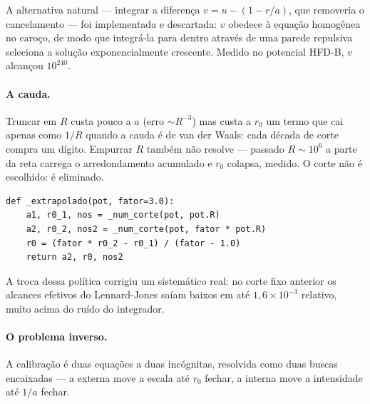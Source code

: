\documentclass[11pt,a4paper]{article}
\newcommand{\cod}[1]{\texttt{\small #1}}
\begin{document}
A alternativa natural --- integrar a diferença $v=u-(1-r/a)$, que removeria o
cancelamento --- foi implementada e descartada: $v$ obedece à equação homogênea
no caroço, de modo que integrá-la para dentro através de uma parede repulsiva
seleciona a solução exponencialmente crescente. Medido no potencial HFD-B, $v$
alcançou $10^{240}$.

\paragraph{A cauda.} Truncar em $R$ custa pouco a $a$ (erro $\sim R^{-3}$) mas
custa a $r_0$ um termo que cai apenas como $1/R$ quando a cauda é de van der
Waals: cada década de corte compra um dígito. Empurrar $R$ também não resolve
--- passado $R\sim10^6$ a parte da reta carrega o arredondamento acumulado e
$r_0$ colapsa, medido. O corte não é escolhido: é eliminado.

\begin{lstlisting}[caption={\cod{lab.py} --- com $r_0(R)=r_0-K/R$, dois cortes a
um fator $F$ de distância eliminam o termo; um terceiro em $F^2R$ confere. Onde
a cauda é exponencial ou ausente os três já concordam e a extrapolação devolve
o mesmo número.}]
def _extrapolado(pot, fator=3.0):
    a1, r0_1, nos = _num_corte(pot, pot.R)
    a2, r0_2, nos2 = _num_corte(pot, fator * pot.R)
    r0 = (fator * r0_2 - r0_1) / (fator - 1.0)
    return a2, r0, nos2
\end{lstlisting}

A troca dessa política corrigiu um sistemático real: no corte fixo anterior os
alcances efetivos do Lennard-Jones saíam baixos em até $1{,}6\times10^{-3}$
relativo, muito acima do ruído do integrador.

\paragraph{O problema inverso.} A calibração é duas equações a duas incógnitas,
resolvida como duas buscas encaixadas --- a externa move a escala até $r_0$
fechar, a interna move a intensidade até $1/a$ fechar.
\end{document}
